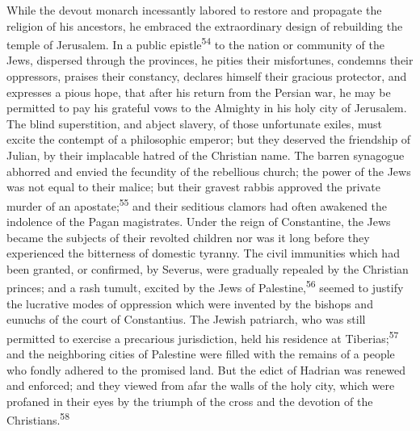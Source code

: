 While the devout monarch incessantly labored to restore and
propagate the religion of his ancestors, he embraced the
extraordinary design of rebuilding the temple of Jerusalem. In a
public epistle\textsuperscript{54} to the nation or community of the Jews,
dispersed through the provinces, he pities their misfortunes,
condemns their oppressors, praises their constancy, declares
himself their gracious protector, and expresses a pious hope,
that after his return from the Persian war, he may be permitted
to pay his grateful vows to the Almighty in his holy city of
Jerusalem. The blind superstition, and abject slavery, of those
unfortunate exiles, must excite the contempt of a philosophic
emperor; but they deserved the friendship of Julian, by their
implacable hatred of the Christian name. The barren synagogue
abhorred and envied the fecundity of the rebellious church; the
power of the Jews was not equal to their malice; but their
gravest rabbis approved the private murder of an apostate;\textsuperscript{55} and
their seditious clamors had often awakened the indolence of the
Pagan magistrates. Under the reign of Constantine, the Jews
became the subjects of their revolted children nor was it long
before they experienced the bitterness of domestic tyranny. The
civil immunities which had been granted, or confirmed, by
Severus, were gradually repealed by the Christian princes; and a
rash tumult, excited by the Jews of Palestine,\textsuperscript{56} seemed to
justify the lucrative modes of oppression which were invented by
the bishops and eunuchs of the court of Constantius. The Jewish
patriarch, who was still permitted to exercise a precarious
jurisdiction, held his residence at Tiberias;\textsuperscript{57} and the
neighboring cities of Palestine were filled with the remains of a
people who fondly adhered to the promised land. But the edict of
Hadrian was renewed and enforced; and they viewed from afar the
walls of the holy city, which were profaned in their eyes by the
triumph of the cross and the devotion of the Christians.\textsuperscript{58}



